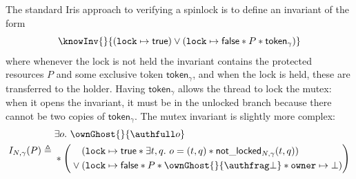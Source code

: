 The standard Iris approach to verifying a spinlock is to define an invariant of the form
\[\knowInv{}{(\texttt{lock} \mapsto \mathsf{true})    {}\vee{} (\texttt{lock} \mapsto \mathsf{false} \ast P \ast \mathsf{token}_\gamma)}
\]
where whenever the lock is not held the invariant contains the protected resources $P$ and some exclusive token $\mathsf{token}_\gamma$, and when the lock is held, these are transferred to the holder. Having $\mathsf{token}_\gamma$ allows the thread to lock the mutex: when it opens the invariant, it must be in the unlocked branch because there cannot be two copies of $\mathsf{token}_\gamma$. The mutex invariant is slightly more complex:
\[
  I_{N, \gamma}(P) \triangleq \begin{aligned}
    &\exists o.\ \ownGhost{}{\authfull o} \\
    &{}\ast \left(\begin{aligned}
      &(\texttt{lock} \mapsto \mathsf{true}
        \ast \exists t, q.\ o = (t, q) \ast \notlocked{N, \gamma}{t}{q}) \\
      {}\vee{} &(\texttt{lock} \mapsto \mathsf{false} \ast P
        \ast \ownGhost{}{\authfrag \bot}
        \ast \texttt{owner} \mapsto \bot)
    \end{aligned}\right)
  \end{aligned}
\]

